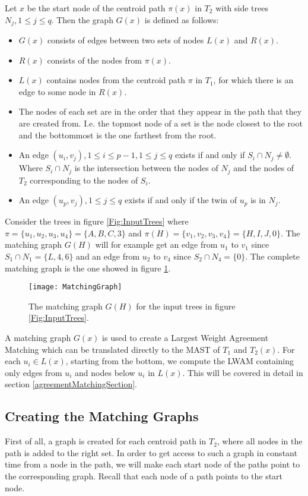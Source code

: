 Let $x$ be the start node of the centroid path $\pi(x)$ in $T_2$ with side trees $N_j, 1 \le j \le q$. Then the graph $G(x)$ is defined as follows:

\begin{itemize}
	\item $G(x)$ consists of edges between two sets of nodes $L(x)$ and $R(x)$.
	\item $R(x)$ consists of the nodes from $\pi(x)$.
	\item $L(x)$ contains nodes from the centroid path $\pi$ in $T_1$, for which there is an edge to some node in $R(x)$.
	\item The nodes of each set are in the order that they appear in the path that they are created from. I.e. the topmost node of a set is the node closest to the root and the bottommost is the one farthest from the root.
	\item An edge $(u_i, v_j), 1 \le i \le p-1, 1 \le j \le q$ exists if and only if $S_i \cap N_j \ne \emptyset$.
	\subitem Where $S_i \cap N_j$ is the intersection between the nodes of $N_j$ and the nodes of $T_2$ corresponding to the nodes of $S_i$.
	\item An edge $(u_p, v_j), 1 \le j \le q$ exists if and only if the twin of $u_p$ is in $N_j$.
\end{itemize}

Consider the trees in figure \ref{Fig:InputTrees} where $\pi = \{u_1,u_2,u_3,u_4\} = \{A,B,C,3\}$ and $\pi(H) = \{v_1,v_2,v_3,v_4\} = \{H,I,J,0\}$. The matching graph $G(H)$ will for example get an edge from $u_1$ to $v_1$ since $S_1 \cap N_1 = \{L,4,6\}$ and an edge from $u_2$ to $v_4$ since $S_2 \cap N_4 = \{0\}$. The complete matching graph is the one showed in figure \ref{matchingGraphFigure}.

\begin{figure}
	\texttt{[image: MatchingGraph]}
	\caption{The matching graph $G(H)$ for the input trees in figure \ref{Fig:InputTrees}.}
	\label{matchingGraphFigure}
\end{figure}

A matching graph $G(x)$ is used to create a Largest Weight Agreement Matching which can be translated directly to the MAST of $T_1$ and $T_2(x)$. For each $u_i \in L(x)$, starting from the bottom, we compute the LWAM containing only edges from $u_i$ and nodes below $u_i$ in $L(x)$. This will be covered in detail in section \ref{agreementMatchingSection}.

\subsection{Creating the Matching Graphs}
First of all, a graph is created for each centroid path in $T_2$, where all nodes in the path is added to the right set. In order to get access to such a graph in constant time from a node in the path, we will make each start node of the paths point to the corresponding graph. Recall that each node of a path points to the start node.

